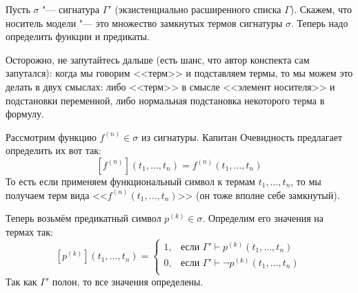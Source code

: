 
		Пусть $\sigma$ "--- сигнатура $\Gamma'$ (экзистенциально расширенного списка $\Gamma$).
		Скажем, что носитель модели "--- это множество замкнутых термов сигнатуры $\sigma$.
		Теперь надо определить функции и предикаты.
		\begin{Rem}
			Осторожно, не запутайтесь дальше (есть шанс, что автор конспекта сам запутался):
			когда мы говорим <<терм>> и подставляем термы, то мы можем это делать в двух смыслах:
			либо <<терм>> в смысле <<элемент носителя>> и подстановки переменной, либо
			нормальная подстановка некоторого терма в формулу.
		\end{Rem}

		Рассмотрим функцию $f^{(n)} \in \sigma$ из сигнатуры.
		Капитан Очевидность предлагает определить их вот так:
		\[ [f^{(n)}](t_1, \dots, t_n) = f^{(n)}(t_1, \dots, t_n) \]
		То есть если применяем функциональный символ к термам $t_1, \dots, t_n$,
		то мы получаем терм вида <<$f^{(n)}(t_1, \dots, t_n)$>> (он тоже вполне себе замкнутый).

		Теперь возьмём предикатный символ $p^{(k)} \in \sigma$.
		Определим его значения на термах так:
		\[
			[p^{(k)}](t_1, \dots, t_n) =
			\begin{cases}
				1, &\text{если } \Gamma' \vdash p^{(k)}(t_1, \dots, t_n) \\
				0, &\text{если } \Gamma' \vdash \lnot p^{(k)}(t_1, \dots, t_n) \\
			\end{cases}
		\]
		Так как $\Gamma'$ полон, то все значения определены.

